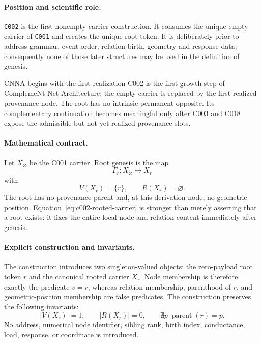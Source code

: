 
\paragraph*{Position and scientific role.}
\texttt{C002} is the first nonempty carrier construction.  It consumes the
unique empty carrier of \texttt{C001} and creates the unique root token.  It
is deliberately prior to address grammar, event order, relation birth,
geometry and response data; consequently none of those later structures may
be used in the definition of genesis.

\begin{cnnaInfoBox}{CNNA begins with the first realization}
C002 is the first growth step of ComplemeNt Net Architecture: the empty carrier is replaced by the first realized provenance node.  The root has no intrinsic permanent opposite.  Its complementary continuation becomes meaningful only after C003 and C018 expose the admissible but not-yet-realized provenance slots.
\end{cnnaInfoBox}

\paragraph*{Mathematical contract.}
Let $X_{\varnothing}$ be the C001 carrier.  Root genesis is the map
\begin{equation}
  \Gamma_r:X_{\varnothing}\longmapsto X_r
  \label{eq:c002-genesis-map}
\end{equation}
with
\begin{equation}
  V(X_r)=\{r\},
  \qquad R(X_r)=\varnothing.
  \label{eq:c002-rooted-carrier}
\end{equation}
The root has no provenance parent and, at this derivation node, no geometric
position.  Equation~\eqref{eq:c002-rooted-carrier} is stronger than merely
asserting that a root exists: it fixes the entire local node and relation
content immediately after genesis.

\paragraph*{Explicit construction and invariants.}
The construction introduces two singleton-valued objects: the zero-payload
root token $r$ and the canonical rooted carrier $X_r$.  Node membership is
therefore exactly the predicate $v=r$, whereas relation membership, parenthood
of $r$, and geometric-position membership are false predicates.  The
construction preserves the following invariants:
\begin{equation}
  |V(X_r)|=1,
  \qquad |R(X_r)|=0,
  \qquad \nexists p\;\operatorname{parent}(r)=p.
  \label{eq:c002-invariants}
\end{equation}
No address, numerical node identifier, sibling rank, birth index,
conductance, load, response, or coordinate is introduced.

